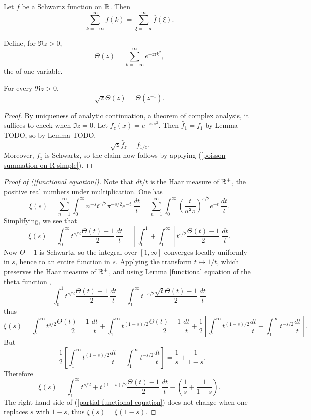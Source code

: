\begin{corollary}
Let $f$ be a Schwartz function on $\mathbb{R}$. Then
\begin{equation}
\label{poisson summation on R simple}
\sum_{k=-\infty}^{\infty} f(k) = \sum_{\xi = -\infty}^{\infty} \hat f(\xi).
\end{equation}
\end{corollary}

\begin{definition}
Define, for $\Re z > 0$,
\[\Theta(z) = \sum_{k=-\infty}^{\infty} e^{-z\pi k^2},\]
the  of one variable.
\end{definition}

\begin{lemma}
\label{functional equation of the theta function}
For every $\Re z > 0$,
\[\sqrt z \Theta(z) = \Theta(z^{-1}).\]
\end{lemma}
\begin{proof}
By uniqueness of analytic continuation, a theorem of complex analysis, it suffices to check when $\Im z = 0$. Let $f_z(x) = e^{-z\pi x^2}$. Then $\hat f_1 = f_1$ by Lemma TODO, so by Lemma TODO,
\[\sqrt z \hat f_{z} = f_{1/z}.\]
Moreover, $f_z$ is Schwartz, so the claim now follows by applying (\ref{poisson summation on R simple}).
\end{proof}

\begin{proof}[Proof of (\ref{functional equation})]
Note that $dt/t$ is the Haar measure of $\mathbb{R}^+$, the positive real numbers under multiplication. One has
\[\xi(s) = \sum_{n=1}^{\infty} \int_0^{\infty} n^{-s} t^{s/2} \pi^{-s/2} e^{-t}~\frac{dt}{t} = \sum_{n=1}^{\infty} \int_0^{\infty} \left(\frac{t}{n^2\pi}\right)^{s/2}e^{-t}~\frac{dt}{t}.\]
Simplifying, we see that
\[\xi(s) = \int_0^{\infty} t^{s/2} \frac{\Theta(t) - 1}{2}~\frac{dt}{t} = \left[\int_0^1 + \int_1^{\infty} \right]t^{s/2} \frac{\Theta(t) - 1}{2}~\frac{dt}{t}.\]
Now $\Theta - 1$ is Schwartz, so the integral over $[1, \infty]$ converges locally uniformly in $s$, hence to an entire function in $s$.
Applying the transform $t \mapsto 1/t$, which preserves the Haar measure of $\mathbb{R}^+$, and using Lemma \ref{functional equation of the theta function},
\[\int_0^1 t^{s/2} \frac{\Theta(t) - 1}{2}~\frac{dt}{t} = \int_1^{\infty} t^{-s/2} \frac{\sqrt t \Theta(t) - 1}{2}~\frac{dt}{t}\]
thus
\[\xi(s) = \int_1^{\infty} t^{s/2} \frac{\Theta(t) - 1}{2}~\frac{dt}{t} + \int_1^{\infty} t^{(1-s)/2} \frac{\Theta(t) - 1}{2}~\frac{dt}{t} + \frac{1}{2} \left[\int_1^{\infty} t^{(1-s)/2} \frac{dt}{t} - \int_1^{\infty} t^{-s/2}\frac{dt}{t} \right].\]
But
\[-\frac{1}{2} \left[\int_1^{\infty} t^{(1-s)/2} \frac{dt}{t} - \int_1^{\infty} t^{-s/2}\frac{dt}{t} \right] = \frac{1}{s} + \frac{1}{1-s}.\]
Therefore
\begin{equation}
\label{partial functional equation}
\xi(s) = \int_1^{\infty} t^{s/2} + t^{(1-s)/2}\frac{\Theta(t) - 1}{2} ~\frac{dt}{t} - \left(\frac{1}{s} + \frac{1}{1-s}\right).
\end{equation}
The right-hand side of (\ref{partial functional equation}) does not change when one replaces $s$ with $1-s$, thus $\xi(s) = \xi(1-s)$.
\end{proof}
